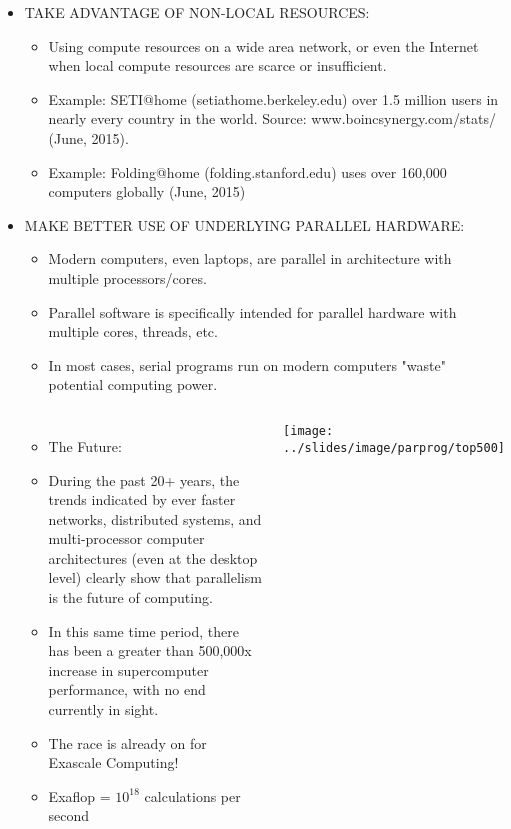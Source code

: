 \documentclass[10pt,t]{beamer}
\begin{document}
\begin{frame}[allowframebreaks,c]
\begin{itemize}
\begin{itemize}
    \end{itemize}
    \framebreak
  \item TAKE ADVANTAGE OF NON-LOCAL RESOURCES:
    \begin{itemize}
    \item Using compute resources on a wide area network, or even the Internet when local compute resources are scarce or insufficient.
    \item Example: SETI@home (setiathome.berkeley.edu) over 1.5 million users in nearly every country in the world. Source: www.boincsynergy.com/stats/ (June, 2015).
    \item Example: Folding@home (folding.stanford.edu) uses over 160,000 computers globally (June, 2015)
    \end{itemize}
  \item MAKE BETTER USE OF UNDERLYING PARALLEL HARDWARE:
    \begin{itemize}
    \item Modern computers, even laptops, are parallel in architecture with multiple processors/cores.
    \item Parallel software is specifically intended for parallel hardware with multiple cores, threads, etc.
    \item In most cases, serial programs run on modern computers "waste" potential computing power.
    \end{itemize}
    \framebreak
    \begin{columns}[c]
      \vspace{-0.25cm}
      \begin{itemize}
      \item The Future:
      \item During the past 20+ years, the trends indicated by ever faster networks, distributed systems, and multi-processor computer architectures (even at the desktop level) clearly show that parallelism is the future of computing.
      \item In this same time period, there has been a greater than 500,000x increase in supercomputer performance, with no end currently in sight.
      \item The race is already on for Exascale Computing!
      \item[] Exaflop = $10^{18}$ calculations per second
      \end{itemize}
      \texttt{[image: ../slides/image/parprog/top500]}
    \end{columns}
  \end{itemize}
\end{frame}
\end{document}
